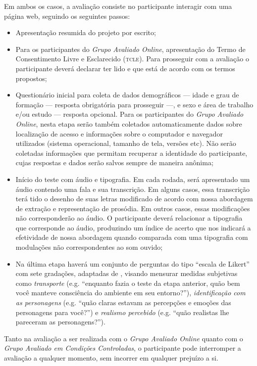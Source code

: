 \documentclass[a4paper,11pt,titlepage,singlespacing]{article}
\begin{document}
Em ambos os casos, a avaliação consiste no participante interagir com uma página web, seguindo os seguintes passos:

\begin{itemize}
    \item Apresentação resumida do projeto por escrito;
    \item Para os participantes do \textit{Grupo Avaliado Online}, apresentação do Termo de Consentimento Livre e Esclarecido (\textsc{tcle}). Para prosseguir com a avaliação o participante deverá declarar ter lido e que está de acordo com os termos propostos;
    \item Questionário inicial para coleta de dados demográficos — idade e grau de formação — resposta obrigatória para prosseguir —, e sexo e área de trabalho e/ou estudo — resposta opcional. Para os participantes do \textit{Grupo Avaliado Online}, nesta etapa serão também coletados automaticamente dados sobre localização de acesso e informações sobre o computador e navegador utilizados (sistema operacional, tamanho de tela, versões etc). Não serão coletadas informações que permitam recuperar a identidade do participante, cujas respostas e dados serão salvos sempre de maneira anônima; 
    \item Início do teste com áudio e tipografia. Em cada rodada, será apresentado um áudio contendo uma fala e sua transcrição. Em alguns casos, essa transcrição terá tido o desenho de suas letras modificado de acordo com nossa abordagem de extração e representação de prosódia. Em outros casos, essas modificações não corresponderão ao áudio. O participante deverá relacionar a tipografia que corresponde ao áudio, produzindo um índice de acerto que nos indicará a efetividade de nossa abordagem quando comparada com uma tipografia com modulações não correspondentes ao som ouvido;
    \item Na última etapa haverá um conjunto de perguntas do tipo ``escala de Likert'' com sete gradações, adaptadas de , visando mensurar medidas subjetivas como \textit{transporte} (e.g. “enquanto fazia o teste da etapa anterior, quão bem você manteve consciência do ambiente em seu entorno?”), \textit{identificação com as personagens} (e.g. “quão claras estavam as percepções e emoções das personagens para você?”) e \textit{realismo percebido} (e.g. “quão realistas lhe pareceram as personagens?”). 
\end{itemize}

\noindent Tanto na avaliação a ser realizada com o \textit{Grupo Avaliado Online} quanto com o \textit{Grupo Avaliado em Condições Controladas}, o participante pode interromper a avaliação a qualquer momento, sem incorrer em qualquer prejuízo a si.
\end{document}
